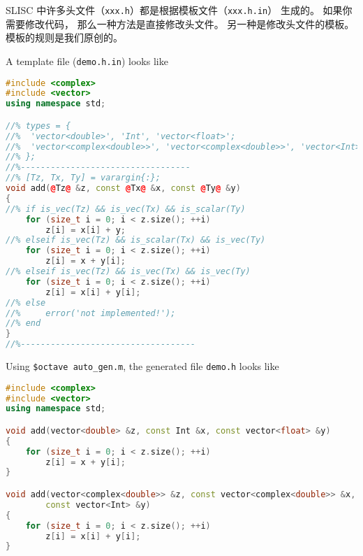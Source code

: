 
\begin{issues}
\issueDraft
\end{issues}


SLISC 中许多头文件（\verb|xxx.h|）都是根据模板文件（\verb|xxx.h.in|） 生成的。 如果你需要修改代码， 那么一种方法是直接修改头文件。 另一种是修改头文件的模板。 模板的规则是我们原创的。

A template file (\verb`demo.h.in`) looks like
\begin{lstlisting}[language=cpp]
#include <complex>
#include <vector>
using namespace std;

//% types = {
//%  'vector<double>', 'Int', 'vector<float>';
//%  'vector<complex<double>>', 'vector<complex<double>>', 'vector<Int>';
//% };
//%----------------------------------
//% [Tz, Tx, Ty] = varargin{:};
void add(@Tz@ &z, const @Tx@ &x, const @Ty@ &y)
{
//% if is_vec(Tz) && is_vec(Tx) && is_scalar(Ty)
	for (size_t i = 0; i < z.size(); ++i)
		z[i] = x[i] + y;
//% elseif is_vec(Tz) && is_scalar(Tx) && is_vec(Ty)
	for (size_t i = 0; i < z.size(); ++i)
		z[i] = x + y[i];
//% elseif is_vec(Tz) && is_vec(Tx) && is_vec(Ty)
	for (size_t i = 0; i < z.size(); ++i)
		z[i] = x[i] + y[i];
//% else
//%     error('not implemented!');
//% end
}
//%-----------------------------------
\end{lstlisting}

Using \verb`$octave auto_gen.m`, the generated file \verb`demo.h` looks like
\begin{lstlisting}[language=cpp]
#include <complex>
#include <vector>
using namespace std;

void add(vector<double> &z, const Int &x, const vector<float> &y)
{
	for (size_t i = 0; i < z.size(); ++i)
		z[i] = x + y[i];
}

void add(vector<complex<double>> &z, const vector<complex<double>> &x,
        const vector<Int> &y)
{
	for (size_t i = 0; i < z.size(); ++i)
		z[i] = x[i] + y[i];
}
\end{lstlisting}
